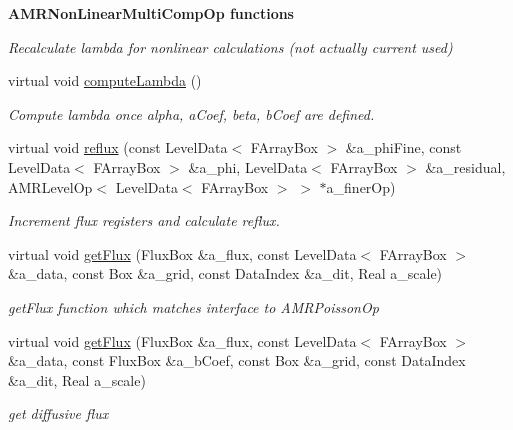 \begin{Indent}{\bf A\-M\-R\-Non\-Linear\-Multi\-Comp\-Op functions}
\begin{DoxyCompactItemize}
\begin{DoxyCompactList}\small\item\em Recalculate lambda for nonlinear calculations (not actually current used) \end{DoxyCompactList}\item 
\hypertarget{class_a_m_r_non_linear_multi_comp_op_a4fe4520a51b78a009eba0cde433949dd}{virtual void \hyperlink{class_a_m_r_non_linear_multi_comp_op_a4fe4520a51b78a009eba0cde433949dd}{compute\-Lambda} ()}\label{class_a_m_r_non_linear_multi_comp_op_a4fe4520a51b78a009eba0cde433949dd}

\begin{DoxyCompactList}\small\item\em Compute lambda once alpha, a\-Coef, beta, b\-Coef are defined. \end{DoxyCompactList}\item 
\hypertarget{class_a_m_r_non_linear_multi_comp_op_a2fb72537fbed147bb56f3eea440746ea}{virtual void \hyperlink{class_a_m_r_non_linear_multi_comp_op_a2fb72537fbed147bb56f3eea440746ea}{reflux} (const Level\-Data$<$ F\-Array\-Box $>$ \&a\-\_\-phi\-Fine, const Level\-Data$<$ F\-Array\-Box $>$ \&a\-\_\-phi, Level\-Data$<$ F\-Array\-Box $>$ \&a\-\_\-residual, A\-M\-R\-Level\-Op$<$ Level\-Data$<$ F\-Array\-Box $>$ $>$ $\ast$a\-\_\-finer\-Op)}\label{class_a_m_r_non_linear_multi_comp_op_a2fb72537fbed147bb56f3eea440746ea}

\begin{DoxyCompactList}\small\item\em Increment flux registers and calculate reflux. \end{DoxyCompactList}\item 
virtual void \hyperlink{class_a_m_r_non_linear_multi_comp_op_a348203bd1783a1ce09fb8dbf876d79ae}{get\-Flux} (Flux\-Box \&a\-\_\-flux, const Level\-Data$<$ F\-Array\-Box $>$ \&a\-\_\-data, const Box \&a\-\_\-grid, const Data\-Index \&a\-\_\-dit, Real a\-\_\-scale)
\begin{DoxyCompactList}\small\item\em get\-Flux function which matches interface to A\-M\-R\-Poisson\-Op \end{DoxyCompactList}\item 
\hypertarget{class_a_m_r_non_linear_multi_comp_op_ab3b9ca0576f197409ff893e598a286d0}{virtual void \hyperlink{class_a_m_r_non_linear_multi_comp_op_ab3b9ca0576f197409ff893e598a286d0}{get\-Flux} (Flux\-Box \&a\-\_\-flux, const Level\-Data$<$ F\-Array\-Box $>$ \&a\-\_\-data, const Flux\-Box \&a\-\_\-b\-Coef, const Box \&a\-\_\-grid, const Data\-Index \&a\-\_\-dit, Real a\-\_\-scale)}\label{class_a_m_r_non_linear_multi_comp_op_ab3b9ca0576f197409ff893e598a286d0}

\begin{DoxyCompactList}\small\item\em get diffusive flux \end{DoxyCompactList}\end{DoxyCompactItemize}
\end{Indent}
